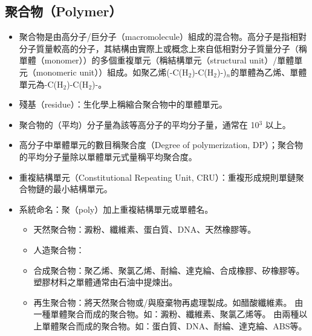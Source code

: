 \documentclass[a4paper,12pt]{report}
\begin{document}
\begin{itemize}
\section{聚合物（Polymer）}
\begin{itemize}
\item 聚合物是由高分子/巨分子（macromolecule）組成的混合物。高分子是指相對分子質量較高的分子，其結構由實際上或概念上來自低相對分子質量分子（稱單體（monomer））的多個重複單元（稱結構單元（structural unit）/單體單元（monomeric unit））組成。如聚乙烯(-C(H$_2$)-C(H$_2$)-)$_n$的單體為乙烯、單體單元為-C(H$_2$)-C(H$_2$)-。
\item 殘基（residue）：生化學上稱縮合聚合物中的單體單元。
\item 聚合物的（平均）分子量為該等高分子的平均分子量，通常在 10$^3$ 以上。
\item 高分子中單體單元的數目稱聚合度（Degree of polymerization, DP）；聚合物的平均分子量除以單體單元式量稱平均聚合度。
\item 重複結構單元（Constitutional Repeating Unit, CRU）：重複形成規則單鏈聚合物鏈的最小結構單元。
\item 系統命名：聚（poly）加上重複結構單元或單體名。
\eit
{}
\begin{itemize}
\item 天然聚合物：澱粉、纖維素、蛋白質、DNA、天然橡膠等。
\item 人造聚合物：
\bit
\item 合成聚合物：聚乙烯、聚氯乙烯、耐綸、達克綸、合成橡膠、矽橡膠等。塑膠材料之單體通常由石油中提煉出。
\item 再生聚合物：將天然聚合物或/與廢棄物再處理製成。如醋酸纖維素。
\eit
\eit
{}
由一種單體聚合而成的聚合物。如：澱粉、纖維素、聚氯乙烯等。
由兩種以上單體聚合而成的聚合物。如：蛋白質、DNA、耐綸、達克綸、ABS等。


\end{itemize}
\end{itemize}
\end{itemize}
\end{document}
